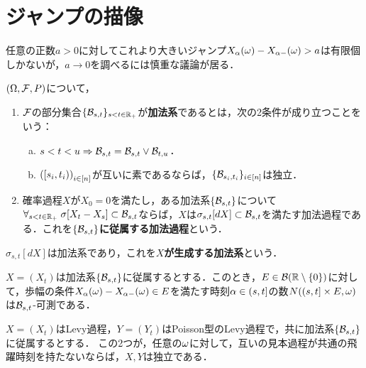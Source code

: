 \documentclass[uplatex,dvipdfmx]{jsreport}
\begin{document}
\section{ジャンプの描像}

\begin{tcolorbox}[colframe=ForestGreen, colback=ForestGreen!10!white,breakable,colbacktitle=ForestGreen!40!white,coltitle=black,fonttitle=\bfseries\sffamily,
title=]
    任意の正数$a>0$に対してこれより大きいジャンプ$X_\alpha(\omega)-X_{\alpha-}(\omega)>a$は有限個しかないが，$a\to0$を調べるには慎重な議論が居る．
\end{tcolorbox}

\begin{definition}
    $(\Omega,\mathcal{F},P)$について，
    \begin{enumerate}
        \item $\mathcal{F}$の部分集合$\{\mathcal{B}_{s,t}\}_{s<t\in\mathbb{R}_+}$が\textbf{加法系}であるとは，次の2条件が成り立つことをいう：
        \begin{enumerate}[(a)]
            \item $s<t<u\Rightarrow\mathcal{B}_{s,t}=\mathcal{B}_{s,t}\lor\mathcal{B}_{t,u}$．
            \item $\left([s_i,t_i)\right)_{i\in[n]}$が互いに素であるならば，$\{\mathcal{B}_{s_i,t_i}\}_{i\in[n]}$は独立．
        \end{enumerate}
        \item 確率過程$X$が$X_0=0$を満たし，ある加法系$\{\mathcal{B}_{s,t}\}$について$\forall_{s<t\in\mathbb{R}_+}\;\sigma[X_t-X_s]\subset\mathcal{B}_{s,t}$ならば，$X$は$\sigma_{s,t}[dX]\subset\mathcal{B}_{s,t}$を満たす加法過程である．これを\textbf{$\{\mathcal{B}_{s,t}\}$に従属する加法過程}という．
    \end{enumerate}
\end{definition}
\begin{example}
    $\sigma_{s,t}[dX]$は加法系であり，これを\textbf{$X$が生成する加法系}という．
\end{example}

\begin{lemma}
    $X=(X_t)$は加法系$\{\mathcal{B}_{s,t}\}$に従属するとする．このとき，$E\in\mathcal{B}(\mathbb{R}\setminus\{0\})$に対して，歩幅の条件$X_\alpha(\omega)-X_{\alpha-}(\omega)\in E$を満たす時刻$\alpha\in(s,t]$の数$N((s,t]\times E,\omega)$は$\mathcal{B}_{s,t}$-可測である．
\end{lemma}

\begin{lemma}[独立性の十分条件]
    $X=(X_t)$はLevy過程，$Y=(Y_t)$はPoisson型のLevy過程で，共に加法系$\{\mathcal{B}_{s,t}\}$に従属するとする．
    この2つが，任意の$\omega$に対して，互いの見本過程が共通の飛躍時刻を持たないならば，$X,Y$は独立である．
\end{lemma}
\end{document}
